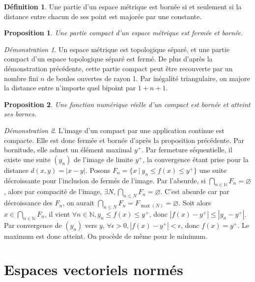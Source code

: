 \documentclass[a4paper, 11pt, french]{book}
\theoremstyle{plain} %
\newtheorem{proposition}{Proposition}
\theoremstyle{definition} %
\newtheorem{definition}{Définition}
\theoremstyle{remark} %
\newtheorem*{demonstration}{Démonstration}
\newcommand{\1}{\mathds{1}}
\newcommand\vide{\varnothing}
\newcommand{\infegal}{\leqslant}
\newcommand{\N}{\mathbb{N}}
\newcommand\ens[2]{\{#1 \ |\ #2\}}
\begin{document}
\begin{definition}
	Une partie d'un espace métrique est bornée si et seulement si la distance entre chacun de ses point est majorée par une constante.
\end{definition}

\begin{proposition}
	Une partie compact d'un espace métrique est fermée et bornée.
\end{proposition}

\begin{demonstration}
	Un espace métrique est topologique séparé, et une partie compact d'un espace topologique séparé est fermé.
	De plus d'après la démonstration précédente, cette partie compact peut être recouverte par un nombre fini $n$ de boules ouvertes de rayon 1.
	Par inégalité triangulaire, on majore la distance entre n'importe quel bipoint par $1+n+1$.
\end{demonstration}

\begin{proposition}
	Une fonction numérique réelle d'un compact est bornée et atteint ses bornes.
\end{proposition}

\begin{demonstration}
	L’image d'un compact par une application continue est compacte.
	Elle est donc fermée et bornée d'après la proposition précédente.
	Par bornitude, elle admet un élément maximal $y^+$.
	Par fermeture séquentielle, il existe une suite $(y_n)$ de l'image de limite $y^+$, la convergence étant prise pour la distance $d(x, y)=|x-y|$.
	Posons $F_n=\ens{x}{y_n\infegal f(x)\infegal y^+}$ une suite décroissante pour l'inclusion de fermés de l'image.
	Par l'absurde, si $\bigcap_{n\in\N}F_n=\vide$, alors par compacité de l'image, $\exists N, \bigcap_{n\infegal N}F_n=\vide$.
	C'est absurde car par décroissance des $F_n$, on aurait $\bigcap_{n\infegal N}F_n=F_{\max(N)}=\vide$.
	Soit alors $x\in\bigcap_{n\in\N}F_n$, il vient $\forall n\in\N, y_n\infegal f(x)\infegal y^+$, donc $|f(x)-y^+| \infegal |y_n-y^+|$.
	Par convergence de $(y_n)$ vers $y$, $\forall\epsilon>0, |f(x)-y^+|<\epsilon$, donc $f(x)=y^+$.
	Le maximum est donc atteint.
	On procède de même pour le minimum.
\end{demonstration}

\chapter{Espaces vectoriels normés}
\end{document}
